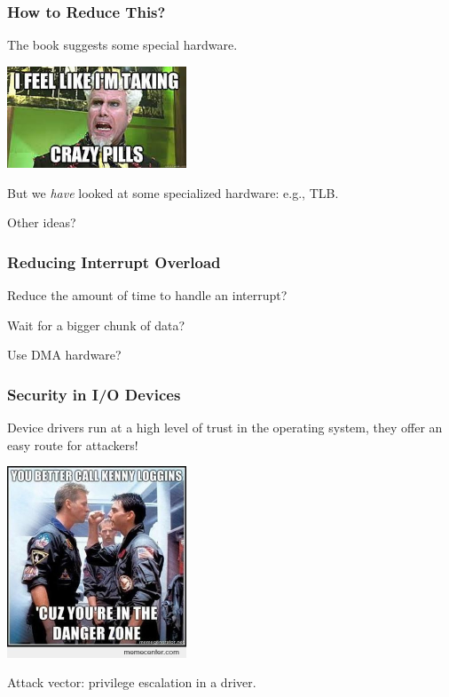 \begin{frame}
\frametitle{How to Reduce This?}

The book suggests some special hardware. 

\begin{center}
	\includegraphics[width=0.4\textwidth]{images/crazypills.jpg}
\end{center}

But we \textit{have} looked at some specialized hardware: e.g., TLB.

Other ideas?
\end{frame}

\begin{frame}
\frametitle{Reducing Interrupt Overload}

Reduce the amount of time to handle an interrupt?

Wait for a bigger chunk of data?

Use DMA hardware?

\end{frame}


\begin{frame}
\frametitle{Security in I/O Devices}
Device drivers run at a high level of trust in the operating system, they offer an easy route for attackers!

\begin{center}
	\includegraphics[width=0.4\textwidth]{images/dangerzone.jpg}
\end{center}

Attack vector: privilege escalation in a driver.

\end{frame}



